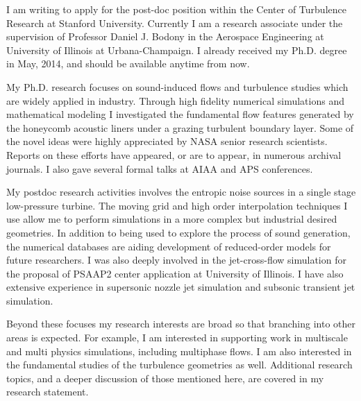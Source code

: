 \documentclass[11pt]{article}
\begin{document}
I am writing to apply for the post-doc position within the Center of Turbulence Research at Stanford University.    Currently I am a research associate under the supervision of Professor Daniel J. Bodony in the Aerospace Engineering at University of Illinois at Urbana-Champaign.  I already received my Ph.D. degree in May, 2014, and should be available anytime from now.   

My Ph.D. research focuses on sound-induced flows and turbulence studies which are widely applied in industry.   Through high fidelity numerical simulations and mathematical modeling I investigated the fundamental flow features generated by the honeycomb acoustic liners under a grazing turbulent boundary layer. Some of the novel ideas were highly appreciated by NASA senior research scientists.   Reports on these efforts have appeared, or are to appear, in numerous archival journals.   I also gave several formal talks at AIAA and APS conferences.   

My postdoc research activities involves the entropic noise sources in a single stage low-pressure turbine.   The moving grid and high order interpolation techniques I use allow me to perform simulations in a more complex but industrial desired geometries.   In addition to being used to explore the process of sound generation, the numerical databases are aiding development of reduced-order models for future researchers.   I was also deeply involved in the jet-cross-flow simulation for the proposal of PSAAP2 center application at University of Illinois.    I have also extensive experience in supersonic nozzle jet simulation and subsonic transient jet simulation.  

Beyond these focuses my research interests are broad so that branching into other areas is expected.   For example, I am interested in supporting work in multiscale and multi physics simulations, including multiphase flows.  I am also interested in the fundamental studies of the turbulence geometries as well.  Additional research topics, and a deeper discussion of those mentioned here, are covered in my research statement. 
\end{document}
